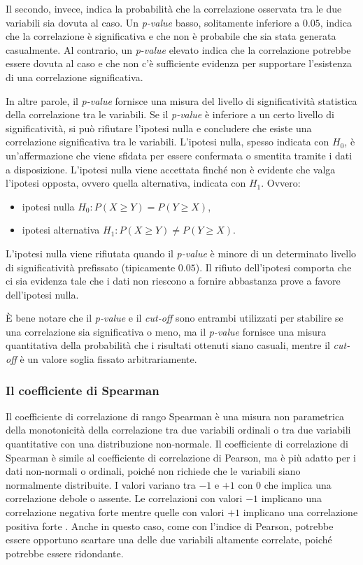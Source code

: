 \documentclass[12pt,italian]{report}
\begin{document}
	Il secondo, invece, indica la probabilità che la correlazione osservata tra le due variabili sia dovuta al caso. Un \textit{p-value} basso, solitamente inferiore a $0.05$, indica che la correlazione è significativa e che non è probabile che sia stata generata casualmente. Al contrario, un \textit{p-value} elevato indica che la correlazione potrebbe essere dovuta al caso e che non c'è sufficiente evidenza per supportare l'esistenza di una correlazione significativa.
	
	In altre parole, il \textit{p-value} fornisce una misura del livello di significatività statistica della correlazione tra le variabili. Se il \textit{p-value} è inferiore a un certo livello di significatività, si può rifiutare l'ipotesi nulla e concludere che esiste una correlazione significativa tra le variabili.
	L'ipotesi nulla, spesso indicata con $H_0$, è un'affermazione che viene sfidata per essere confermata o smentita tramite i dati a disposizione. L'ipotesi nulla viene accettata finché non è evidente che valga l'ipotesi opposta, ovvero quella alternativa, indicata con $H_1$. Ovvero:
	\begin{itemize}
		\item ipotesi nulla $H_0: P(X \geq Y) = P(Y \geq X)$,
		\item ipotesi alternativa $H_1: P(X \geq Y) \neq P(Y \geq X)$.
	\end{itemize}
	
	L'ipotesi nulla viene rifiutata quando il \textit{p-value} è minore di un determinato livello di significatività prefissato (tipicamente $0.05$). Il rifiuto dell'ipotesi comporta che ci sia evidenza tale che i dati non riescono a fornire abbastanza prove a favore dell'ipotesi nulla.
	
	
	È bene notare che il \textit{p-value} e il \textit{cut-off} sono entrambi utilizzati per stabilire se una correlazione sia significativa o meno, ma il \textit{p-value} fornisce una misura quantitativa della probabilità che i risultati ottenuti siano casuali, mentre il \textit{cut-off} è un valore soglia fissato arbitrariamente.
	
	\subsubsection{Il coefficiente di Spearman}
	Il coefficiente di correlazione di rango Spearman è una misura non parametrica della monotonicità della correlazione tra due variabili ordinali o tra due variabili quantitative con una distribuzione non-normale. Il coefficiente di correlazione di Spearman è simile al coefficiente di correlazione di Pearson, ma è più adatto per i dati non-normali o ordinali, poiché non richiede che le variabili siano normalmente distribuite. I valori variano tra $-1$ e $+1$ con $0$ che implica una correlazione debole o assente. Le correlazioni con valori $-1$ implicano una correlazione negativa forte mentre quelle con valori $+1$ implicano una correlazione positiva forte \cite{spearman}. Anche in questo caso, come con l'indice di Pearson, potrebbe essere opportuno scartare una delle due variabili altamente correlate, poiché potrebbe essere ridondante.
	
\end{document}
